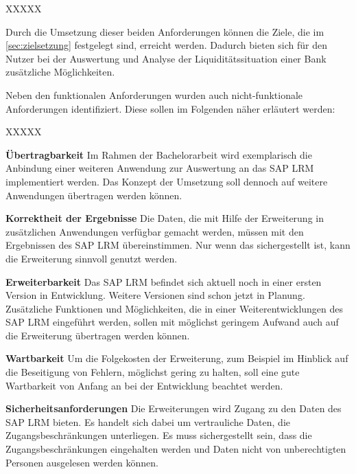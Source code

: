 \begin{onehalfspacing}
\begin{seToplist}{ XXXXX }
\end{seToplist}

Durch die Umsetzung dieser beiden  Anforderungen können die Ziele, die im \vref{sec:zielsetzung} festgelegt sind, erreicht werden. Dadurch bieten sich für den Nutzer bei der Auswertung und Analyse der Liquiditätssituation einer Bank zusätzliche Möglichkeiten.

Neben den funktionalen Anforderungen wurden auch nicht-funktionale Anforderungen identifiziert. Diese sollen im Folgenden näher erläutert werden:

\begin{seToplist}{ XXXXX }

\item[\anfl{uebertragbarkeit}] \textbf{Übertragbarkeit} \newline
Im Rahmen der Bachelorarbeit wird exemplarisch die Anbindung einer weiteren Anwendung zur Auswertung an das SAP LRM implementiert werden. Das Konzept der Umsetzung soll dennoch auf weitere Anwendungen übertragen werden können.

\item[\anfl{korrektheit}] \textbf{Korrektheit der Ergebnisse} \newline
Die Daten, die mit Hilfe der Erweiterung in zusätzlichen Anwendungen verfügbar gemacht werden, müssen mit den Ergebnissen des SAP LRM übereinstimmen. Nur wenn das sichergestellt ist, kann die Erweiterung sinnvoll genutzt werden.

\item[\anfl{erweiterbarkeit}] \textbf{Erweiterbarkeit} \newline
Das SAP LRM befindet sich aktuell noch in einer ersten Version in Entwicklung. Weitere Versionen sind schon jetzt in Planung. Zusätzliche Funktionen und Möglichkeiten, die in einer Weiterentwicklungen des SAP LRM eingeführt werden, sollen mit möglichst geringem Aufwand auch auf die Erweiterung übertragen werden können.

\item[\anfl{wartbarkeit}] \textbf{Wartbarkeit} \newline
Um die Folgekosten der Erweiterung, zum Beispiel im Hinblick auf die Beseitigung von Fehlern, möglichst gering zu halten, soll eine gute Wartbarkeit von Anfang an bei der Entwicklung beachtet werden.

\item[\anfl{sicherheit}] \textbf{Sicherheitsanforderungen} \newline
Die Erweiterungen wird Zugang zu den Daten des SAP LRM bieten. Es handelt sich dabei um vertrauliche Daten, die  Zugangsbeschränkungen unterliegen. Es muss sichergestellt sein, dass die Zugangsbeschränkungen eingehalten werden und Daten nicht von unberechtigten Personen ausgelesen werden können.


\end{seToplist}
\end{onehalfspacing}
